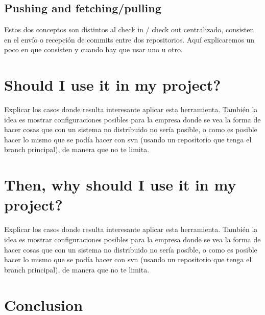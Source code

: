 \documentclass[%
	final,
	notitlepage,
	narroweqnarray,
	inline,
	twoside,
	]{ieee}
\begin{document}
\subsection{Pushing and fetching/pulling}

Estos dos conceptos son distintos al check in / check out centralizado, 
consisten en el envío o recepción de commits entre dos repositorios. Aquí 
explicaremos un poco en que consisten y cuando hay que usar uno u otro.

\section{Should I use it in my project?}

Explicar los casos donde resulta interesante aplicar esta herramienta. 
También la idea es mostrar configuraciones posibles para la empresa donde 
se vea la forma de hacer cosas que con un sistema no distribuido no sería 
posible, o como es posible hacer lo mismo que se podía hacer con svn 
(usando un repositorio que tenga el branch principal), de manera que 
no te limita.

\section{Then, why should I use it in my project?}

Explicar los casos donde resulta interesante aplicar esta herramienta. 
También la idea es mostrar configuraciones posibles para la empresa donde 
se vea la forma de hacer cosas que con un sistema no distribuido no sería 
posible, o como es posible hacer lo mismo que se podía hacer con svn 
(usando un repositorio que tenga el branch principal), de manera que 
no te limita.

\section{Conclusion}
\end{document}
